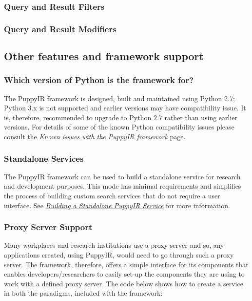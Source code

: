 \documentclass[letterpaper,10pt,english]{sphinxmanual}
\begin{document}
\subsubsection{Query and Result Filters}
\label{overview:id3}

\subsubsection{Query and Result Modifiers}
\label{overview:id4}

\subsection{Other features and framework support}
\label{overview:other-features-and-framework-support}

\subsubsection{Which version of Python is the framework for?}
\label{overview:which-version-of-python-is-the-framework-for}
The PuppyIR framework is designed, built and maintained using Python 2.7; Python 3.x is not supported and earlier versions may have compatibility issue. It is, therefore, recommended to upgrade to Python 2.7 rather than using earlier versions. For details of some of the known Python compatibility issues please consult the {\hyperref[issues:issues]{\emph{Known issues with the PuppyIR framework}}} page.


\subsubsection{Standalone Services}
\label{overview:standalone-services}
The PuppyIR framework can be used to build a standalone service for research and development purposes.  This mode has minimal requirements and simplifies the process of building custom search services that do not require a user interface. See {\hyperref[standalone-service:building-a-standalone-puppyir-service]{\emph{Building a Standalone PuppyIR Service}}} for more information.


\subsubsection{Proxy Server Support}
\label{overview:proxy-server-support}
Many workplaces and research institutions use a proxy server and so, any applications created, using PuppyIR, would need to go through such a proxy server. The framework, therefore, offers a simple interface for its components that enables developers/researchers to easily set-up the components they are using to work with a defined proxy server. The code below shows how to create a service in both the paradigms, included with the framework:
\end{document}
